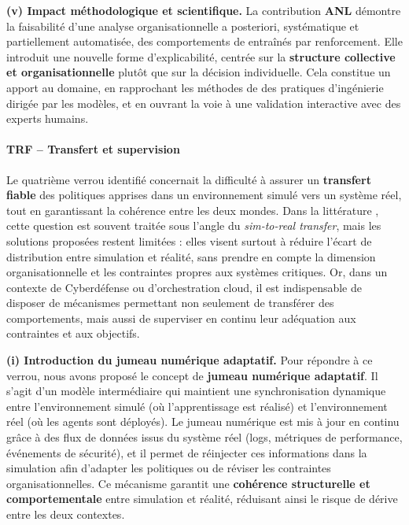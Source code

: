 \medskip
\noindent
\textbf{(v) Impact méthodologique et scientifique.}
La contribution \textbf{ANL} démontre la faisabilité d'une analyse organisationnelle a posteriori, systématique et partiellement automatisée, des comportements de  entraînés par renforcement.
Elle introduit une nouvelle forme d'explicabilité, centrée sur la \textbf{structure collective et organisationnelle} plutôt que sur la décision individuelle.
Cela constitue un apport au domaine, en rapprochant les méthodes de  des pratiques d'ingénierie dirigée par les modèles, et en ouvrant la voie à une validation interactive avec des experts humains.

\paragraph{TRF – Transfert et supervision}

Le quatrième verrou identifié concernait la difficulté à assurer un \textbf{transfert fiable} des politiques apprises dans un environnement simulé vers un système réel, tout en garantissant la cohérence entre les deux mondes.
Dans la littérature , cette question est souvent traitée sous l'angle du \textit{sim-to-real transfer}, mais les solutions proposées restent limitées :
elles visent surtout à réduire l'écart de distribution entre simulation et réalité, sans prendre en compte la dimension organisationnelle et les contraintes propres aux systèmes critiques.
Or, dans un contexte de Cyberdéfense ou d'orchestration cloud, il est indispensable de disposer de mécanismes permettant non seulement de transférer des comportements, mais aussi de superviser en continu leur adéquation aux contraintes et aux objectifs.

\medskip
\noindent
\textbf{(i) Introduction du jumeau numérique adaptatif.}
Pour répondre à ce verrou, nous avons proposé le concept de \textbf{jumeau numérique adaptatif}.
Il s'agit d'un modèle intermédiaire qui maintient une synchronisation dynamique entre l'environnement simulé (où l'apprentissage est réalisé) et l'environnement réel (où les agents sont déployés).
Le jumeau numérique est mis à jour en continu grâce à des flux de données issus du système réel (logs, métriques de performance, événements de sécurité), et il permet de réinjecter ces informations dans la simulation afin d'adapter les politiques ou de réviser les contraintes organisationnelles.
Ce mécanisme garantit une \textbf{cohérence structurelle et comportementale} entre simulation et réalité, réduisant ainsi le risque de dérive entre les deux contextes.

